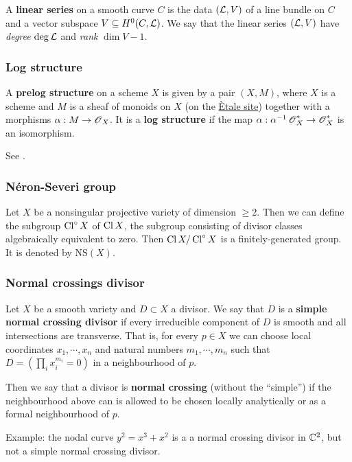 \documentclass[11pt, english]{article}
\begin{document}
A \textbf{linear series} on a smooth curve $C$ is the data $(\mathcal{L},V)$ of a line bundle on $C$ and a vector subspace $V \subseteq H^0(C,\mathcal{L})$. We say that the linear series $(\mathcal{L},V)$ have \emph{degree} $\deg \mathcal{L}$ and \emph{rank} $\dim V - 1$. 

\subsubsection{Log structure}
\label{logstructure}

A \textbf{prelog structure} on a scheme $X$ is given by a pair $(X,M)$, where $X$ is a scheme and $M$ is a sheaf of monoids on $X$ (on the \hyperref[etalesite]{Ètale site}) together with a morphisms $\alpha:M \to \operatorname{\mathscr{O}}_X$. It is a \textbf{log structure} if the map $\alpha:\alpha^{-1}\operatorname{\mathscr{O}}_X^\ast \to \operatorname{\mathscr{O}}_X^\ast$ is an isomorphism.

See \cite{kato_log}.

\subsubsection{Néron-Severi group}
\label{neronseveri}

Let $X$ be a nonsingular projective variety of dimension $\geq 2$. Then we can define the subgroup $\operatorname{Cl}^\circ X $ of $\operatorname{Cl} X$, the subgroup consisting of divisor classes algebraically equivalent to zero. Then $\operatorname{Cl} X/\operatorname{Cl}^\circ X$ is a finitely-generated group. It is denoted by $\mathrm{NS}(X)$.

\subsubsection{Normal crossings divisor}
\label{normalcrossingsdivisor}

Let $X$ be a smooth variety and $D \subset X$ a divisor. We say that $D$ is a \textbf{simple normal crossing divisor} if every irreducible component of $D$ is smooth and all intersections are transverse. That is, for every $p \in X$ we can choose local coordinates $x_1,\cdots,x_n$ and natural numbers $m_1,\cdots,m_n$ such that $D=\left( \prod_{i} x_i^{m_i} =0 \right)$ in a neighbourhood of $p$.

Then we say that a divisor is \textbf{normal crossing} (without the ``simple'') if the neighbourhood above can is allowed to be chosen locally analytically or as a formal neighbourhood of $p$.

Example: the nodal curve $y^2=x^3+x^2$ is a a normal crossing divisor in $\mathbb{C}^2$, but not a simple normal crossing divisor.
\end{document}
